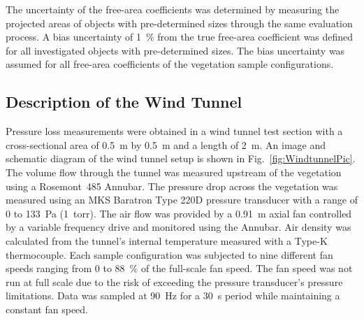 \documentclass[12pt]{article}
\begin{document}
The uncertainty of the free-area coefficients was determined by measuring the projected areas of objects with pre-determined sizes through the same evaluation process. A bias uncertainty of 1~\% from the true free-area coefficient was defined for all investigated objects with pre-determined sizes. The bias uncertainty was assumed for all free-area coefficients of the vegetation sample configurations. 

\subsection{Description of the Wind Tunnel}
\label{ssec:headingscap}

Pressure loss measurements were obtained in a wind tunnel test section with a cross-sectional area of 0.5~\si{m} by 0.5~\si{m} and a length of 2~\si{m}. An image and schematic diagram of the wind tunnel setup is shown in Fig.~\ref{fig:WindtunnelPic}. The volume flow through the tunnel was measured upstream of the vegetation using a Rosemont~485 Annubar. The pressure drop across the vegetation was measured using an MKS Baratron Type 220D pressure transducer with a range of 0 to 133~Pa (1~torr). The air flow was provided by a 0.91~m axial fan controlled by a variable frequency drive and monitored using the Annubar. Air density was calculated from the tunnel's internal temperature measured with a Type-K thermocouple. Each sample configuration was subjected to nine different fan speeds ranging from 0 to 88~\% of the full-scale fan speed. The fan speed was not run at full scale due to the risk of exceeding the pressure transducer's pressure limitations. Data was sampled at 90~\si{Hz} for a 30~\si{s} period while maintaining a constant fan speed.
\end{document}
